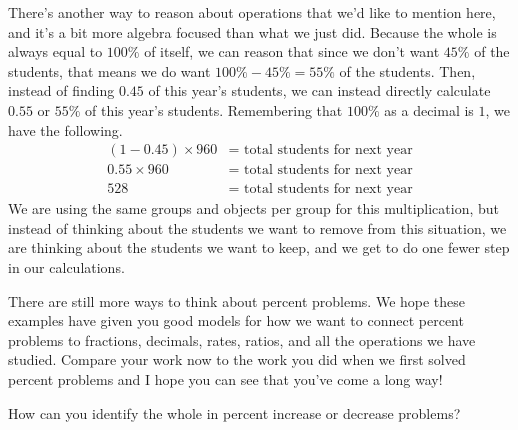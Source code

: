 \documentclass{ximera}
\begin{document}
There's another way to reason about operations that we'd like to mention here, and it's a bit more algebra focused than what we just did. Because the whole is always equal to $100\%$ of itself, we can reason that since we don't want $45\%$ of the students, that means we do want $100\% - 45\% = 55\%$ of the students. Then, instead of finding $0.45$ of this year's students, we can instead directly calculate $0.55$ or $55\%$ of this year's students. Remembering that $100\%$ as a decimal is $1$, we have the following.
\begin{align*}
(1 - 0.45) \times 960 &= \textrm{ total students for next year} \\
0.55 \times 960 &= \textrm{ total students for next year} \\
528 &= \textrm{ total students for next year}
\end{align*}
We are using the same groups and objects per group for this multiplication, but instead of thinking about the students we want to remove from this situation, we are thinking about the students we want to keep, and we get to do one fewer step in our calculations. 

There are still more ways to think about percent problems. We hope these examples have given you good models for how we want to connect percent problems to fractions, decimals, rates, ratios, and all the operations we have studied. Compare your work now to the work you did when we first solved percent problems and I hope you can see that you've come a long way!

\begin{question}
How can you identify the whole in percent increase or decrease problems?
\begin{multipleChoice}
\end{multipleChoice}
\end{question}
\end{document}
